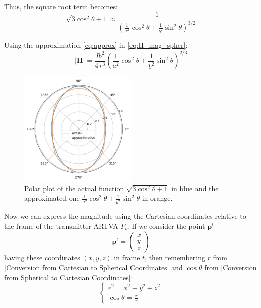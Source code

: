 
Thus, the square root term becomes:
\begin{equation}
    \sqrt{ 3 \cos^2 \theta + 1} \approx \frac{1}{\left(\frac{1}{a^2} \cos^2 \theta + \frac{1}{b^2} \sin^2 \theta\right)^{3/2}}
    \label{eq:approx}
\end{equation}

Using the approximation \eqref{eq:approx} in \eqref{eq:H_mag_spher}:
\begin{equation}
    \left| \mathbf{H} \right| = \frac{I b^2}{4 \, r^3} \left(\frac{1}{a^2} \cos^2 \theta + \frac{1}{b^2} \sin^2 \theta\right)^{2/3}
    \label{eq:H_mag_approx}
\end{equation}

\begin{figure}[h!]
\centering
\includegraphics[width=0.5\textwidth]{images/polar_plot.png}
\caption{Polar plot of the actual function $\sqrt{ 3 \cos^2 \theta + 1} $ in blue 
and the approximated one $\frac{1}{a^2 }\cos^2 \theta + \frac{1}{b^2} \sin^2 \theta$ in orange.}
\label{fig:polarplot}
\end{figure}

Now we can express the magnitude using the Cartesian coordinates relative to the frame of the transmitter ARTVA $F_t$. 
If we consider the point $\mathbf{p}^t$\[
\mathbf{p}^t = \begin{pmatrix}
    x \\
    y \\
    z
\end{pmatrix}
\] having these coordinates $(x,y,z)$ in frame $t$, then remembering $r$ from \ref{Conversion from Cartesian to Spherical Coordinates} and $\cos\theta$ from \ref{Conversion from Spherical to Cartesian Coordinates}:
\[
\begin{cases}
r^2 = x^2 + y^2 + z^2 \\
\cos\theta = \frac{x}{r}
\end{cases}
\]


